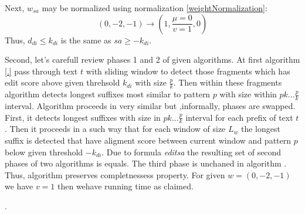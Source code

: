 Next, $w_{sa}$ may be normalized using normalization \ref{weightNormalization}:
\begin{displaymath}
(0, -2, -1) \rightarrow (1,\frac{\mu=0}{v=1}, 0)
\end{displaymath}
Thus, $d_{di} \leq k_{di}$ is the same as $sa \geq -k_{di}$.

Second, let's carefull review phases 1 and 2 of given algorithms.
At first algorithm \ref{.} pass through text $t$ with sliding window to detect those fragments which has edit score above given threhsold $k_{di}$ with size $\frac{p}{k}$.
Then within these fragments algorithm detects longest suffixes most similar to pattern $p$ with size within  $pk...\frac{p}{k}$ interval.
Algorithm \cite{.} proceeds in very similar but ,informally, phases are swapped.
First, it detects longest suffixes with size in $pk...\frac{p}{k}$ interval for each prefix of text $t$.
Then it proceeds in a such way that for each window of size $L_{w}$ the longest suffix is detected that have aligment score between current window and pattern $p$ below given threshold $-k_{di}$.
Due to formula  \emph{editsa} the resulting set of second phases of two algorithms is equals.
The third phase is unchaned in algorithm \cite{.}.
Thus, algorithm \cite{}  preserves  completnessess property.
For given $w = (0,-2,-1)$ we have $v=1$ then wehave running time as claimed.


%
 .


